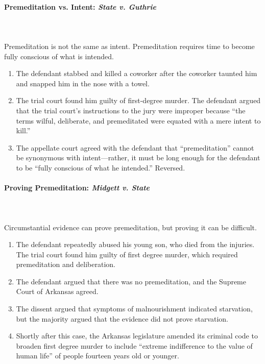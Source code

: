 \paragraph{Premeditation vs. Intent: \emph{State v. Guthrie}}
~\\\\
Premeditation is not the same as intent. Premeditation requires time to become 
fully conscious of what is intended.

\begin{enumerate}
    \item The defendant stabbed and killed a coworker after the coworker 
    taunted him and snapped him in the nose with a towel.
    \item The trial court found him guilty of first-degree murder. The 
    defendant argued that the trial court's instructions to the jury were 
    improper because ``the terms wilful, deliberate, and premeditated were 
    equated with a mere intent to kill.''
    \item The appellate court agreed with the defendant that ``premeditation'' 
    cannot be synonymous with intent---rather, it must be long enough for the 
    defendant to be ``fully conscious of what he intended.'' Reversed.
\end{enumerate}

\paragraph{Proving Premeditation: \emph{Midgett v. State}}
~\\\\
Circumstantial evidence can prove premeditation, but proving it can be 
difficult.

\begin{enumerate}
    \item The defendant repeatedly abused his young son, who died from the 
    injuries. The trial court found him guilty of first degree murder, which 
    required premeditation and deliberation.
    \item The defendant argued that there was no premeditation, and the 
    Supreme Court of Arkansas agreed.
    \item The dissent argued that symptoms of malnourishment indicated 
    starvation, but the majority argued that the evidence did not prove 
    starvation.
    \item Shortly after this case, the Arkansas legislature amended its 
    criminal code to broaden first degree murder to include ``extreme 
    indifference to the value of human life'' of people fourteen years old or 
    younger.
\end{enumerate}

